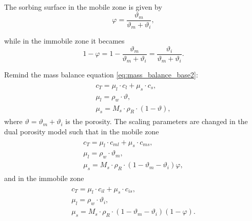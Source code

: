 The sorbing surface in the mobile zone is given by
\begin{equation}
  \varphi = \frac{\vartheta_m}{\vartheta_m + \vartheta_i}, 
\end{equation}

while in the immobile zone it becames
\[ 1 - \varphi = 1-\frac{\vartheta_m}{\vartheta_m + \vartheta_i} = \frac{\vartheta_i}{\vartheta_m + \vartheta_i}. \]

Remind the mass balance equation \eqref{eq:mass_balance_base2}:
\begin{eqnarray}
 \begin{array}{l}
  c_T = \mu_l\cdot c_l + \mu_s\cdot c_s,\\
  \mu_l = \rho_w \cdot \vartheta, \\
  \mu_s = M_s \cdot\rho_R\cdot(1-\vartheta),
 \end{array}
 \label{eq:scale_params}
\end{eqnarray}
where $\vartheta = \vartheta_m + \vartheta_i$ is the porosity.
The scaling parameters are changed in the dual porosity model such that in the mobile zone
\begin{eqnarray}
 \begin{array}{l}
  c_T = \mu_l\cdot c_{ml} + \mu_s\cdot c_{ms},\\
  \mu_l = \rho_w \cdot \vartheta_m, \\
  \mu_s = M_s \cdot\rho_R\cdot(1-\vartheta_m - \vartheta_i)\varphi,
 \end{array}
 \label{eq:scale_params_m}
\end{eqnarray}
and in the immobile zone
\begin{eqnarray}
 \begin{array}{l}
  c_T = \mu_l\cdot c_{il} + \mu_s\cdot c_{is},\\
  \mu_l = \rho_w \cdot \vartheta_i, \\
  \mu_s = M_s \cdot\rho_R\cdot(1-\vartheta_m - \vartheta_i)(1 - \varphi).
 \end{array}
 \label{eq:scale_params_i}
\end{eqnarray}